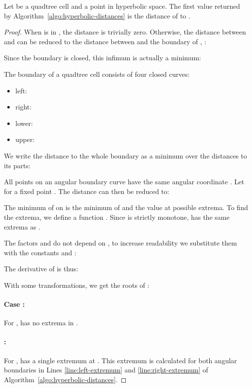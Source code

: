 \documentclass{llncs}
\begin{document}
\pagebreak 

\begin{lemma}
 Let  be a quadtree cell and  a point in hyperbolic space.
 The first value returned by Algorithm~\ref{algo:hyperbolic-distances} is the distance of  to .
 \label{lemma:hyperbolic-distances}
\end{lemma}


\begin{proof}
When  is in , the distance is trivially zero.
Otherwise, the distance between  and  can be reduced to the distance between  and the boundary of , :

Since the boundary is closed, this infimum is actually a minimum:

The boundary of a quadtree cell consists of four closed curves:
\begin{itemize}
 \item left: 
 \item right: 
 \item lower: 
 \item upper: 
\end{itemize}
We write the distance to the whole boundary as a minimum over the distances to its parts:


All points on an angular boundary curve  have the same angular coordinate .
Let  for a fixed point .
The distance  can then be reduced to:

The minimum of  on  is the minimum of    and the value at possible extrema.
To find the extrema, we define a function .
Since  is strictly monotone,  has the same extrema as .

The factors  and  do not depend on , to increase readability we substitute them with the constants  and :

The derivative of  is thus:

With some transformations, we get the roots of :
\paragraph*{Case :}
 
For ,  has no extrema in .

\paragraph*{ :}


For  ,  has a single extremum at .
This extremum is calculated for both angular boundaries in Lines \ref{line:left-extremum} and \ref{line:right-extremum} of Algorithm~\ref{algo:hyperbolic-distances}.


\end{proof}
\end{document}
